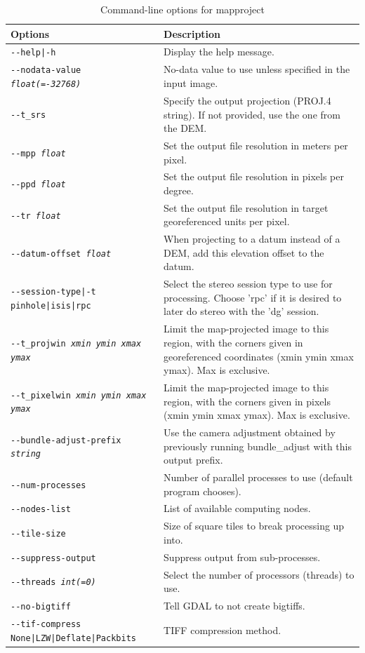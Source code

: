\begin{longtable}{|l|p{10cm}|}
\caption{Command-line options for mapproject}
\label{tbl:mapproject}
\endfirsthead
\endhead
\endfoot
\endlastfoot
\hline
Options & Description \\ \hline \hline
\texttt{-\/-help|-h} & Display the help message. \\ \hline
\texttt{-\/-nodata-value \textit{float(=-32768)}} & No-data value to use unless specified in the input image. \\ \hline
\texttt{-\/-t\_srs} & Specify the output projection (PROJ.4 string). If not provided, use the one from the DEM. \\ \hline
\texttt{-\/-mpp \textit{float}} & Set the output file resolution in meters per pixel. \\ \hline
\texttt{-\/-ppd \textit{float}} & Set the output file resolution in pixels per degree. \\ \hline
\texttt{-\/-tr \textit{float}} & Set the output file resolution in target georeferenced 
units per pixel. \\ \hline
\texttt{-\/-datum-offset \textit{float}} & When projecting to a datum instead of a DEM, add this elevation offset to the datum. \\ \hline
\texttt{-\/-session-type|-t pinhole|isis|rpc} & Select the stereo
session type to use for processing. Choose 'rpc' if it is desired to later do stereo with the 'dg' session. \\ \hline
\texttt{-\/-t\_projwin \textit{xmin ymin xmax ymax}} & Limit the map-projected image to this region, with the corners given in georeferenced coordinates (xmin ymin xmax ymax). Max is exclusive. \\ \hline
\texttt{-\/-t\_pixelwin \textit{xmin ymin xmax ymax}} & Limit the map-projected image to this region, with the corners given in pixels (xmin ymin xmax ymax). Max is exclusive. \\ \hline
\texttt{-\/-bundle-adjust-prefix \textit{string}} & Use the camera
adjustment obtained by previously running bundle\_adjust with this
output prefix. \\ \hline
\texttt{-\/-num-processes} & Number of parallel processes to use (default program chooses).\\ \hline
\texttt{-\/-nodes-list} & List of available computing nodes.\\ \hline
\texttt{-\/-tile-size} & Size of square tiles to break processing up into.\\ \hline
\texttt{-\/-suppress-output} & Suppress output from sub-processes.\\ \hline
\texttt{-\/-threads \textit{int(=0)}} & Select the number of processors (threads) to use.\\ \hline
\texttt{-\/-no-bigtiff} & Tell GDAL to not create bigtiffs.\\ \hline
\texttt{-\/-tif-compress None|LZW|Deflate|Packbits} & TIFF compression method.\\ \hline
\end{longtable}

